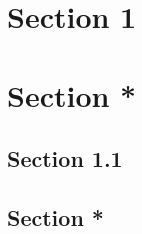 \documentclass{article}
\begin{document}
\section{Section 1}
\section*{Section *}
\subsection{Section 1.1}
\subsection*{Section *}
\end{document}
